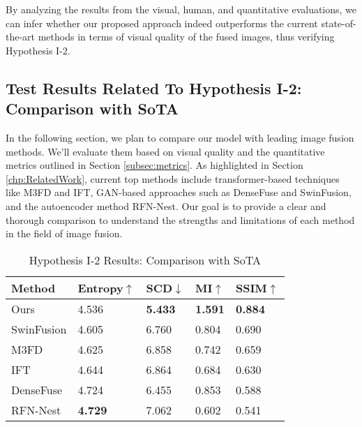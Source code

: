 By analyzing the results from the visual, human, and quantitative evaluations, we can infer whether our proposed approach indeed outperforms the current state-of-the-art methods in terms of visual quality of the fused images, thus verifying Hypothesis I-2.

\subsection{Test Results Related To Hypothesis I-2: Comparison with SoTA} \label{subsec:met9res}

In the following section, we plan to compare our model with leading image fusion methods. We'll evaluate them based on visual quality and the quantitative metrics outlined in Section \ref{subsec:metrics}. As highlighted in Section \ref{chp:RelatedWork}, current top methods include transformer-based techniques like M3FD\cite{liu2022target} and IFT\cite{vs2022image}, GAN-based approaches such as DenseFuse\cite{li2019infrared} and SwinFusion\cite{ma2022swinfusion}, and the autoencoder method RFN-Nest\cite{li2021rfn}. Our goal is to provide a clear and thorough comparison to understand the strengths and limitations of each method in the field of image fusion.

\begin{table}[htbp]
    \centering
    \caption{Hypothesis I-2 Results: Comparison with SoTA}
    \label{tab:ch5:met8}
    \begin{tabular}{|l|l|l|l|l|}
        \hline
        \textbf{Method} & \textbf{Entropy\cite{roberts2008assessment}$\uparrow$ } & \textbf{SCD\cite{aslantas2015new}$\downarrow$} & \textbf{MI\cite{qu2002information}$\uparrow$} & \textbf{SSIM\cite{ma2015perceptual}$\uparrow$} \\ \hline
        Ours            & 4.536                & \textbf{5.433}       & \textbf{1.591}           &\textbf{0.884}             \\ \hline
        SwinFusion\cite{ma2022swinfusion}           & 4.605                & 6.760       & 0.804           & 0.690             \\ \hline
        M3FD\cite{liu2022target}           & 4.625                & 6.858       & 0.742           & 0.659             \\ \hline
        IFT\cite{vs2022image}           & 4.644                & 6.864       & 0.684           & 0.630             \\ \hline
        DenseFuse\cite{li2019infrared}           & 4.724                & 6.455       & 0.853           & 0.588             \\ \hline
        RFN-Nest\cite{li2021rfn}            & \textbf{4.729}                & 7.062       & 0.602           & 0.541             \\ \hline
    \end{tabular}
\end{table}


